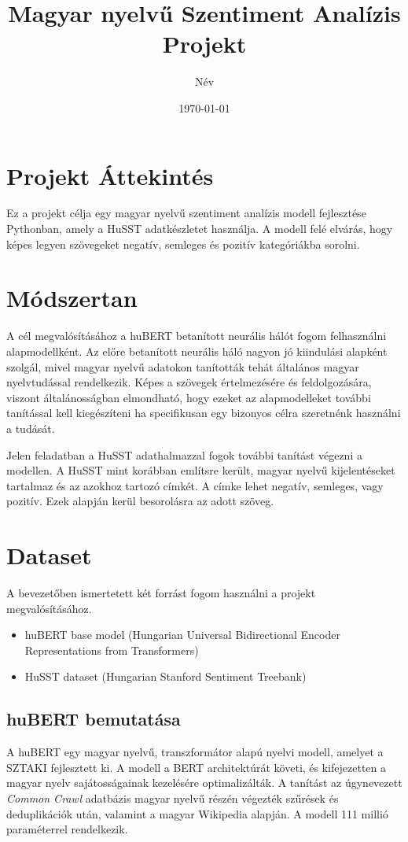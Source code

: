 \documentclass[12pt]{article}
\title{Magyar nyelvű Szentiment Analízis Projekt}
\author{Név}
\date{\today}
\begin{document}
\maketitle
\newpage

\tableofcontents
\newpage

\section{Projekt Áttekintés}
Ez a projekt célja egy magyar nyelvű szentiment analízis modell fejlesztése Pythonban, amely a HuSST adatkészletet használja. A modell felé elvárás, hogy képes legyen szövegeket negatív, semleges és pozitív kategóriákba sorolni.

\section{Módszertan}
A cél megvalósításához a huBERT betanított neurális hálót fogom felhasználni alapmodellként. Az előre betanított neurális háló nagyon jó kiindulási alapként szolgál, mivel magyar nyelvű adatokon tanították tehát általános magyar nyelvtudással rendelkezik. Képes a szövegek értelmezésére és feldolgozására, viszont általánosságban elmondható, hogy ezeket az alapmodelleket további tanítással kell kiegészíteni ha specifikusan egy bizonyos célra szeretnénk használni a tudását.

Jelen feladatban a HuSST adathalmazzal fogok további tanítást végezni a modellen. A HuSST mint korábban említsre került, magyar nyelvű kijelentéseket tartalmaz és az azokhoz tartozó címkét. A címke lehet negatív, semleges, vagy pozitív. Ezek alapján kerül besorolásra az adott szöveg. 


\section{Dataset}

A bevezetőben ismertetett két forrást fogom használni a projekt megvalósításához.

\begin{itemize}
    \item huBERT base model (Hungarian Universal Bidirectional Encoder Representations from Transformers)
    \item HuSST dataset (Hungarian Stanford Sentiment Treebank)
\end{itemize}

\subsection{huBERT bemutatása}
A huBERT egy magyar nyelvű, transzformátor alapú nyelvi modell, amelyet a SZTAKI fejlesztett ki. A modell a BERT architektúrát követi, és kifejezetten a magyar nyelv sajátosságainak kezelésére optimalizálták. A tanítást az úgynevezett \textit{Common Crawl} adatbázis magyar nyelvű részén végezték szűrések és deduplikációk után, valamint a magyar Wikipedia alapján. A modell 111 millió paraméterrel rendelkezik.
\end{document}
